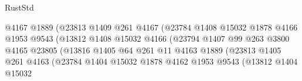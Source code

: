 \begin{lexlean}{RustStd}
\begin{coremodule}
                                            @4167
                                            @1889
                                            (@23813
                                              @1409
                                              @261
                                              @4167
                                              (@23784
                                                @1408
                                                @15032
                                                @1878
                                                @4166
                                                @1953
                                                @9543
                                                (@13812
                                                  @1408
                                                  @15032
                                                  @4166
                                                  (@23794
                                                    @1407
                                                    @99
                                                    @263
                                                    @3800
                                                    @4165
                                                    @23805
                                                    (@13816
                                                      @1405
                                                      @64
                                                      @261
                                                      @11
                                                      @4163
                                                      @1889
                                                      (@23813
                                                        @1405
                                                        @261
                                                        @4163
                                                        (@23784
                                                          @1404
                                                          @15032
                                                          @1878
                                                          @4162
                                                          @1953
                                                          @9543
                                                          (@13812
                                                            @1404
                                                            @15032

\end{coremodule}
\end{lexlean}
